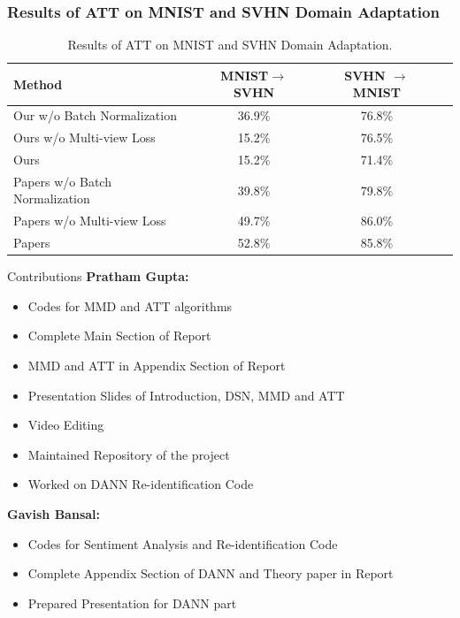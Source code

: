 \documentclass{beamer}
\begin{document}
\begin{frame}
    \frametitle{Results of ATT on MNIST and SVHN Domain Adaptation}

    \begin{table}[h]
        \centering
        \caption{Results of ATT on MNIST and SVHN Domain Adaptation.}
        \label{tab:att_results}
        \begin{tabular}{lccc}
            \toprule
            \textbf{Method} & \textbf{MNIST\(\to\)SVHN} & \textbf{SVHN \(\to\) MNIST} \\
            \midrule
            Our w/o Batch Normalization & 36.9\% & 76.8\% \\
            Ours w/o Multi-view Loss & 15.2\% & 76.5\% \\
            Ours  & 15.2\% & 71.4\% \\
            \midrule
            Papers w/o Batch Normalization & 39.8\% & 79.8\% \\
            Papers w/o Multi-view Loss & 49.7\% & 86.0\% \\
            Papers  & 52.8\% & 85.8\% \\
            \bottomrule
        \end{tabular}
      \end{table}
\end{frame}


\begin{frame}{Contributions}
\textbf{Pratham Gupta:}
\begin{itemize}
    \item Codes for MMD and ATT algorithms
    \item Complete Main Section of Report
    \item MMD and ATT in Appendix Section of Report
    \item Presentation Slides of Introduction, DSN, MMD and ATT
    \item Video Editing
    \item Maintained Repository of the project
    \item Worked on DANN Re-identification Code
\end{itemize}

\vspace{0.5em}
\textbf{Gavish Bansal:}
\begin{itemize}
    \item Codes for Sentiment Analysis and Re-identification Code
    \item Complete Appendix Section of DANN and Theory paper in Report
    \item Prepared Presentation for DANN part
\end{itemize}
\end{frame}
\end{document}
